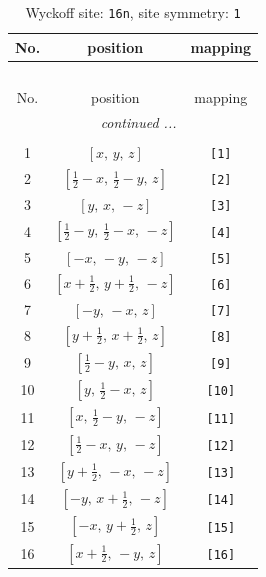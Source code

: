 \documentclass[fleqn,8pt]{jsarticle}
\begin{document}
\begin{longtable}{ccc}
\caption{Wyckoff site: {\tt 16n}, site symmetry: {\tt 1}}
 \\
 \hline \hline
No. & position & mapping \\ \hline \endfirsthead

\multicolumn{2}{l}{\tablename\ \thetable{}} \\
 \hline \hline
No. & position & mapping \\ \hline \endhead

 \hline \hline
\multicolumn{2}{r}{\footnotesize\it continued ...} \\ \endfoot

 \hline \hline
\multicolumn{2}{r}{} \\ \endlastfoot

1 & $\left[ x,\, y,\, z \right]$ & {\tt [1]} \\ \hline
2 & $\left[ \frac{1}{2} - x,\, \frac{1}{2} - y,\, z \right]$ & {\tt [2]} \\ \hline
3 & $\left[ y,\, x,\, - z \right]$ & {\tt [3]} \\ \hline
4 & $\left[ \frac{1}{2} - y,\, \frac{1}{2} - x,\, - z \right]$ & {\tt [4]} \\ \hline
5 & $\left[ - x,\, - y,\, - z \right]$ & {\tt [5]} \\ \hline
6 & $\left[ x + \frac{1}{2},\, y + \frac{1}{2},\, - z \right]$ & {\tt [6]} \\ \hline
7 & $\left[ - y,\, - x,\, z \right]$ & {\tt [7]} \\ \hline
8 & $\left[ y + \frac{1}{2},\, x + \frac{1}{2},\, z \right]$ & {\tt [8]} \\ \hline
9 & $\left[ \frac{1}{2} - y,\, x,\, z \right]$ & {\tt [9]} \\ \hline
10 & $\left[ y,\, \frac{1}{2} - x,\, z \right]$ & {\tt [10]} \\ \hline
11 & $\left[ x,\, \frac{1}{2} - y,\, - z \right]$ & {\tt [11]} \\ \hline
12 & $\left[ \frac{1}{2} - x,\, y,\, - z \right]$ & {\tt [12]} \\ \hline
13 & $\left[ y + \frac{1}{2},\, - x,\, - z \right]$ & {\tt [13]} \\ \hline
14 & $\left[ - y,\, x + \frac{1}{2},\, - z \right]$ & {\tt [14]} \\ \hline
15 & $\left[ - x,\, y + \frac{1}{2},\, z \right]$ & {\tt [15]} \\ \hline
16 & $\left[ x + \frac{1}{2},\, - y,\, z \right]$ & {\tt [16]} \\
\end{longtable}
\end{document}
